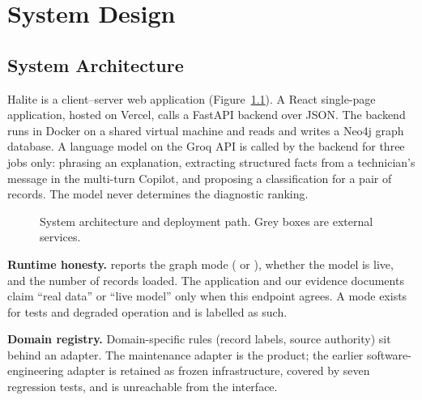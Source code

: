 \chapter{System Design}\label{ch:design}

\section{System Architecture}
Halite is a client--server web application (Figure~\ref{fig:arch}). A React single-page application, hosted on Vercel, calls a FastAPI backend over JSON. The backend runs in Docker on a shared virtual machine and reads and writes a Neo4j graph database. A language model on the Groq API is called by the backend for three jobs only: phrasing an explanation, extracting structured facts from a technician's message in the multi-turn Copilot, and proposing a classification for a pair of records. The model never determines the diagnostic ranking.

\begin{figure}[htb]
\centering

\caption{System architecture and deployment path. Grey boxes are external services.}\label{fig:arch}
\end{figure}

\textbf{Runtime honesty.}  reports the graph mode ( or ), whether the model is live, and the number of records loaded. The application and our evidence documents claim ``real data'' or ``live model'' only when this endpoint agrees. A  mode exists for tests and degraded operation and is labelled as such.

\textbf{Domain registry.} Domain-specific rules (record labels, source authority) sit behind an adapter. The maintenance adapter is the product; the earlier software-engineering adapter is retained as frozen infrastructure, covered by seven regression tests, and is unreachable from the interface.

